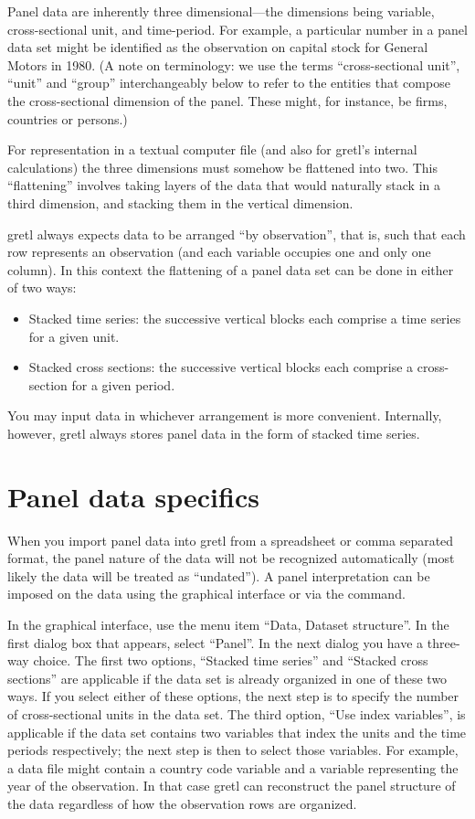 Panel data are inherently three dimensional---the dimensions being
variable, cross-sectional unit, and time-period.  For example, a
particular number in a panel data set might be identified as the
observation on capital stock for General Motors in 1980.  (A note on
terminology: we use the terms ``cross-sectional unit'', ``unit'' and
``group'' interchangeably below to refer to the entities that compose
the cross-sectional dimension of the panel.  These might, for
instance, be firms, countries or persons.)

For representation in a textual computer file (and also for gretl's
internal calculations) the three dimensions must somehow be flattened
into two.  This ``flattening'' involves taking layers of the data that
would naturally stack in a third dimension, and stacking them in the
vertical dimension.

gretl always expects data to be arranged ``by observation'',
that is, such that each row represents an observation (and each
variable occupies one and only one column).  In this context the
flattening of a panel data set can be done in either of two ways:

\begin{itemize}
\item Stacked time series: the successive vertical blocks each
  comprise a time series for a given unit.
\item Stacked cross sections: the successive vertical blocks each
  comprise a cross-section for a given period.
\end{itemize}

You may input data in whichever arrangement is more convenient.
Internally, however, gretl always stores panel data in
the form of stacked time series.

\section{Panel data specifics}
\label{sec:more-panel}

When you import panel data into gretl from a spreadsheet or
comma separated format, the panel nature of the data will not be
recognized automatically (most likely the data will be treated as
``undated'').  A panel interpretation can be imposed on the data
using the graphical interface or via the  command.

In the graphical interface, use the menu item ``Data, Dataset
structure''.  In the first dialog box that appears, select ``Panel''.
In the next dialog you have a three-way choice.  The first two
options, ``Stacked time series'' and ``Stacked cross sections'' are
applicable if the data set is already organized in one of these two
ways.  If you select either of these options, the next step is to
specify the number of cross-sectional units in the data set.  The
third option, ``Use index variables'', is applicable if the data set
contains two variables that index the units and the time periods
respectively; the next step is then to select those variables.  For
example, a data file might contain a country code variable and a
variable representing the year of the observation.  In that case
gretl can reconstruct the panel structure of the data regardless
of how the observation rows are organized.

